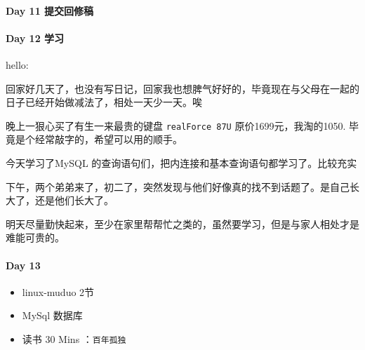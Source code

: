 \documentclass[UTF8,a4paper,8pt]{ctexart}
\begin{document}
	\paragraph{Day 11   提交回修稿   \quad     }
	\paragraph{Day 12   学习   \quad     }
		hello:
		
		回家好几天了，也没有写日记，回家我也想脾气好好的，毕竟现在与父母在一起的日子已经开始做减法了，相处一天少一天。唉
		
		晚上一狠心买了有生一来最贵的键盘 \verb|realForce 87U| 原价1699元，我淘的1050. 毕竟是个经常敲字的，希望可以用的顺手。
		
		今天学习了MySQL 的查询语句们，把内连接和基本查询语句都学习了。比较充实
		
		下午，两个弟弟来了，初二了，突然发现与他们好像真的找不到话题了。是自己长大了，还是他们长大了。
		
		明天尽量勤快起来，至少在家里帮帮忙之类的，虽然要学习，但是与家人相处才是难能可贵的。
	\paragraph{Day 13      \quad     }
		\begin{itemize}[itemindent = 1em]
			\renewcommand\labelitemi{\makebox[0pt][l]{$\square$}\raisebox{.15ex}{\hspace{0.1em}$\checkmark$}}		
			\item   linux-muduo 2节
			\item   MySql 数据库
			
			\renewcommand\labelitemi{\makebox[0pt][l]{$\square$}\hspace{1em}}
			\item   读书  30 Mins	：\verb|百年孤独|
			
		\end{itemize}
\end{document}
